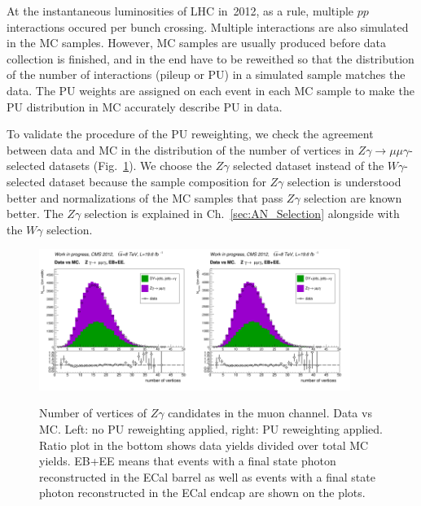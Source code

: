 At the instantaneous luminosities of LHC in~2012, as a rule, multiple $pp$ interactions occured per bunch crossing. Multiple interactions are also simulated in the MC samples. However, MC samples are usually produced before data collection is finished, and in the end have to be reweithed so that the distribution of the number of interactions (pileup or PU) in a simulated sample matches the data. The PU weights are assigned on each event in each MC sample to make the PU distribution in MC accurately describe PU in data.



To validate the procedure of the PU reweighting, we check the agreement between data and MC in the distribution of the number of vertices in $Z\gamma\rightarrow\mu\mu\gamma$-selected datasets (Fig.~\ref{fig:DATAvsMC_nVtx}). We choose the $Z\gamma$ selected dataset instead of the $W\gamma$-selected dataset because the sample composition for $Z\gamma$ selection is understood better and normalizations of the MC samples that pass $Z\gamma$ selection are known better. The $Z\gamma$ selection is explained in Ch.~\ref{sec:AN_Selection} alongside with the $W\gamma$ selection.

\begin{figure}[htb]
  \begin{center}
   \includegraphics[width=0.45\textwidth]{../figs/figs_v11/MUON_ZGamma/PrepareYields/c_TotalDATAvsMC_EtaCommon__nVtx_noPU.png}\includegraphics[width=0.45\textwidth]{../figs/figs_v11/MUON_ZGamma/PrepareYields/c_TotalDATAvsMC_EtaCommon__nVtx.png}
  \caption{Number of vertices of $Z\gamma$ candidates in the muon channel. Data vs MC. Left: no PU reweighting applied, right: PU reweighting applied. Ratio plot in the bottom shows data yields divided over total MC yields. EB+EE means that events with a final state photon reconstructed in the ECal barrel as well as  events with a final state photon reconstructed in the ECal endcap are shown on the plots.}
  \label{fig:DATAvsMC_nVtx}
  \end{center}
\end{figure}
